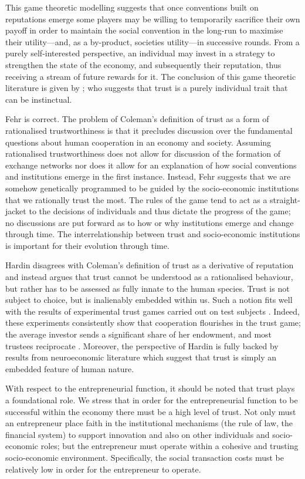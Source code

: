 \begin{subappendices}
This game theoretic modelling suggests that once conventions built on reputations emerge some players may be willing to temporarily sacrifice their own payoff in order to maintain the social convention in the long-run to maximise their utility---and, as a by-product, societies utility---in successive rounds. From a purely self-interested perspective, an individual may invest in a strategy to strengthen the state of the economy, and subsequently their reputation, thus receiving a stream of future rewards for it. The conclusion of this game theoretic literature is given by \citet{Fehr2009}; who suggests that trust is a purely individual trait that can be instinctual.

Fehr is correct. The problem of Coleman's definition of trust as a form of rationalised trustworthiness is that it precludes discussion over the fundamental questions about human cooperation in an economy and society. Assuming rationalised trustworthiness does not allow for discussion of the formation of exchange networks nor does it allow for an explanation of how social conventions and institutions emerge in the first instance. Instead, Fehr suggests that we are somehow genetically programmed to be guided by the socio-economic institutions that we rationally trust the most. The rules of the game tend to act as a straight-jacket to the decisions of individuals and thus dictate the progress of the game; no discussions are put forward as to how or why institutions emerge and change through time. The interrelationship between trust and socio-economic institutions is important for their evolution through time.

Hardin disagrees with Coleman's definition of trust as a derivative of reputation and instead argues that trust cannot be understood as a rationalised behaviour, but rather has to be assessed as fully innate to the human species. Trust is not subject to choice, but is inalienably embedded within us. Such a notion fits well with the results of experimental trust games carried out on test subjects \citep{Kosfeld2005, Zak2008}. Indeed, these experiments consistently show that cooperation flourishes in the trust game; the average investor sends a significant share of her endowment, and most trustees reciprocate \citep{Camerer2003}. Moreover, the perspective of Hardin is fully backed by results from neuroeconomic literature which suggest that trust is simply an embedded feature of human nature.

With respect to the entrepreneurial function, it should be noted that trust plays a foundational role. We stress that in order for the entrepreneurial function to be successful within the economy there must be a high level of trust. Not only must an entrepreneur place faith in the institutional mechanisms (the rule of law, the financial system) to support innovation and also on other individuals and socio-economic roles; but the entrepreneur must operate within a cohesive and trusting socio-economic environment. Specifically, the social transaction costs must be relatively low in order for the entrepreneur to operate.


\end{subappendices}
